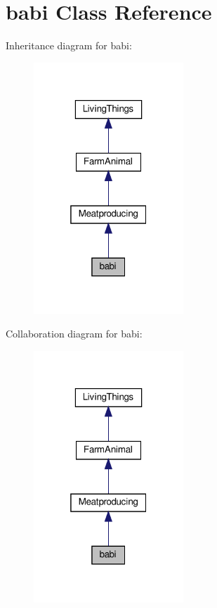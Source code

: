\hypertarget{classbabi}{}\section{babi Class Reference}
\label{classbabi}


Inheritance diagram for babi\+:
\nopagebreak
\begin{figure}[H]
\begin{center}
\leavevmode
\includegraphics[width=160pt]{classbabi__inherit__graph}
\end{center}
\end{figure}


Collaboration diagram for babi\+:
\nopagebreak
\begin{figure}[H]
\begin{center}
\leavevmode
\includegraphics[width=160pt]{classbabi__coll__graph}
\end{center}
\end{figure}
